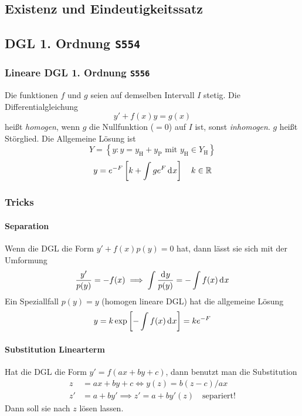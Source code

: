 \documentclass[margin=small, twocolumn]{hsrzf}
\numberwithin{equation}{subsection}
\newcommand{\brpage}[1]{\textcolor{red!70!black}{\small\texttt{S#1}}}
\begin{document}
\subsection{Existenz und Eindeutigkeitssatz}

\subsection{DGL 1. Ordnung \brpage{554}}
\subsubsection{Lineare DGL 1. Ordnung \brpage{556}}
Die funktionen \(f\) und \(g\) seien auf demselben Intervall \(I\) stetig. Die Differentialgleichung
\[
    y' + f(x)y = g(x)
\]
hei{\ss}t \emph{homogen}, wenn \(g\) die Nullfunktion (\(=0\)) auf \(I\) ist, sonst \emph{inhomogen}. \(g\) hei{\ss}t St\"orglied.
Die Allgemeine L\"osung ist
\[
    Y = \left\{ y : y = y_\text{H} + y_\text{P} \text{ mit } y_\text{H} \in Y_\text{H}\right\}
\]
\[
    y = e^{-F}\left[k + \int ge^F\,\mathrm{d}^{} x\right]
    \quad k \in \mathbb{R}
\]

\subsubsection{Tricks}

\paragraph{Separation} Wenn die DGL die Form \(y' + f(x) p(y) = 0\) hat, dann l\"asst sie sich mit der Umformung
\[
    \frac{y'}{p(y)} = -f(x) \implies \int \frac{\mathrm{d}^{} y}{p(y)} = - \int f(x) \,\mathrm{d}^{} x
\]
Ein Speziallfall \(p(y) = y\) (homogen lineare DGL) hat die allgemeine L\"osung
\[
    y = k\exp\left[-\int f(x) \,\mathrm{d}^{} x \right] = k{ e}^{-F}
\]

\paragraph{Substitution Linearterm} Hat die DGL die Form \(y' = f(ax + by + c)\), dann benutzt man die Substitution
\begin{align*}
    z  &= ax + by + c \iff y(z) = b(z-c)/ax \\
    z' &= a + by' \implies z' = a + b y'(z) \quad\text{separiert!}
\end{align*}
Dann soll sie nach \(z\) l\"osen lassen.
\end{document}
